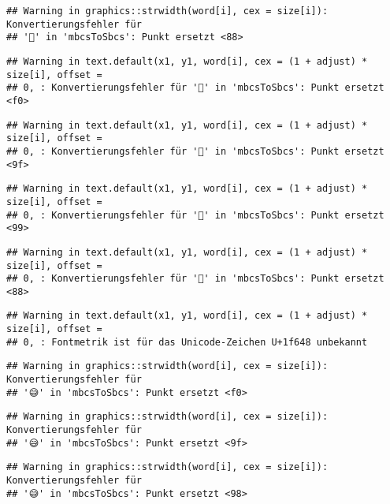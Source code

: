 \documentclass[
]{book}
\begin{document}
\begin{verbatim}
## Warning in graphics::strwidth(word[i], cex = size[i]): Konvertierungsfehler für
## '🙈' in 'mbcsToSbcs': Punkt ersetzt <88>
\end{verbatim}

\begin{verbatim}
## Warning in text.default(x1, y1, word[i], cex = (1 + adjust) * size[i], offset =
## 0, : Konvertierungsfehler für '🙈' in 'mbcsToSbcs': Punkt ersetzt <f0>
\end{verbatim}

\begin{verbatim}
## Warning in text.default(x1, y1, word[i], cex = (1 + adjust) * size[i], offset =
## 0, : Konvertierungsfehler für '🙈' in 'mbcsToSbcs': Punkt ersetzt <9f>
\end{verbatim}

\begin{verbatim}
## Warning in text.default(x1, y1, word[i], cex = (1 + adjust) * size[i], offset =
## 0, : Konvertierungsfehler für '🙈' in 'mbcsToSbcs': Punkt ersetzt <99>
\end{verbatim}

\begin{verbatim}
## Warning in text.default(x1, y1, word[i], cex = (1 + adjust) * size[i], offset =
## 0, : Konvertierungsfehler für '🙈' in 'mbcsToSbcs': Punkt ersetzt <88>
\end{verbatim}

\begin{verbatim}
## Warning in text.default(x1, y1, word[i], cex = (1 + adjust) * size[i], offset =
## 0, : Fontmetrik ist für das Unicode-Zeichen U+1f648 unbekannt
\end{verbatim}

\begin{verbatim}
## Warning in graphics::strwidth(word[i], cex = size[i]): Konvertierungsfehler für
## '😅' in 'mbcsToSbcs': Punkt ersetzt <f0>
\end{verbatim}

\begin{verbatim}
## Warning in graphics::strwidth(word[i], cex = size[i]): Konvertierungsfehler für
## '😅' in 'mbcsToSbcs': Punkt ersetzt <9f>
\end{verbatim}

\begin{verbatim}
## Warning in graphics::strwidth(word[i], cex = size[i]): Konvertierungsfehler für
## '😅' in 'mbcsToSbcs': Punkt ersetzt <98>
\end{verbatim}
\end{document}
